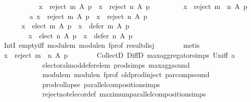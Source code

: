 \begin{isabellebody}
\ \ \isamarkupfalse%
\isanewline
\ \ \isamarkupfalse%
\ \isamarkupfalse%
\isanewline
\ \ \ \ {\isachardoublequoteopen}{\isacharparenleft}{\kern0pt}x\ {\isasymin}\ reject\ m\ A\ p\ {\isasymand}\ x\ {\isasymin}\ reject\ n\ A\ p{\isacharparenright}{\kern0pt}\ {\isasymlongrightarrow}\isanewline
\ \ \ \ \ \ \ \ x\ {\isasymin}\ reject\ {\isacharparenleft}{\kern0pt}m\ {\isasymparallel}\isactrlsub {\isasymup}\ n{\isacharparenright}{\kern0pt}\ A\ p{\isachardoublequoteclose}\isanewline
\ \ \isamarkupfalse%
\isanewline
\ \ \ \ \isamarkupfalse%
\ a{\isacharcolon}{\kern0pt}\ {\isachardoublequoteopen}x\ {\isasymin}\ reject\ m\ A\ p\ {\isasymand}\ x\ {\isasymin}\ reject\ n\ A\ p{\isachardoublequoteclose}\isanewline
\ \ \ \ \isamarkupfalse%
\isanewline
\ \ \ \ \ \ {\isachardoublequoteopen}x\ {\isasymnotin}\ elect\ m\ A\ p\ {\isasymand}\ x\ {\isasymnotin}\ defer\ m\ A\ p\ {\isasymand}\isanewline
\ \ \ \ \ \ \ \ x\ {\isasymnotin}\ elect\ n\ A\ p\ {\isasymand}\ x\ {\isasymnotin}\ defer\ n\ A\ p{\isachardoublequoteclose}\isanewline
\ \ \ \ \ \ \isamarkupfalse%
\ IntI\ empty{\isacharunderscore}{\kern0pt}iff\ module{\isacharunderscore}{\kern0pt}m\ module{\isacharunderscore}{\kern0pt}n\ f{\isacharunderscore}{\kern0pt}prof\ result{\isacharunderscore}{\kern0pt}disj\isanewline
\ \ \ \ \ \ \isamarkupfalse%
\ metis\isanewline
\ \ \ \ \isamarkupfalse%
\ {\isachardoublequoteopen}x\ {\isasymin}\ reject\ {\isacharparenleft}{\kern0pt}m\ {\isasymparallel}\isactrlsub {\isasymup}\ n{\isacharparenright}{\kern0pt}\ A\ p{\isachardoublequoteclose}\isanewline
\ \ \ \ \ \ \isamarkupfalse%
\ CollectD\ DiffD{}\ max{\isacharunderscore}{\kern0pt}aggregator{\isachardot}{\kern0pt}simps\ Un{\isacharunderscore}{\kern0pt}iff\ a\isanewline
\ \ \ \ \ \ \ \ \ \ \ \ electoral{\isacharunderscore}{\kern0pt}mod{\isacharunderscore}{\kern0pt}defer{\isacharunderscore}{\kern0pt}elem\ prod{\isachardot}{\kern0pt}simps\ max{\isacharunderscore}{\kern0pt}agg{\isacharunderscore}{\kern0pt}sound\isanewline
\ \ \ \ \ \ \ \ \ \ \ \ module{\isacharunderscore}{\kern0pt}m\ module{\isacharunderscore}{\kern0pt}n\ f{\isacharunderscore}{\kern0pt}prof\ old{\isachardot}{\kern0pt}prod{\isachardot}{\kern0pt}inject\ par{\isacharunderscore}{\kern0pt}comp{\isacharunderscore}{\kern0pt}sound\isanewline
\ \ \ \ \ \ \ \ \ \ \ \ prod{\isachardot}{\kern0pt}collapse\ parallel{\isacharunderscore}{\kern0pt}composition{\isachardot}{\kern0pt}simps\isanewline
\ \ \ \ \ \ \ \ \ \ \ \ reject{\isacharunderscore}{\kern0pt}not{\isacharunderscore}{\kern0pt}elec{\isacharunderscore}{\kern0pt}or{\isacharunderscore}{\kern0pt}def\ maximum{\isacharunderscore}{\kern0pt}parallel{\isacharunderscore}{\kern0pt}composition{\isachardot}{\kern0pt}simps\isanewline

\end{isabellebody}
